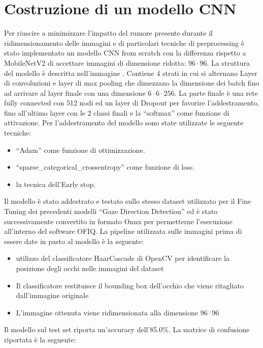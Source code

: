 \documentclass[12pt,a4paper,openright,twoside]{book}
\begin{document}
\section{Costruzione di un modello CNN}
\label{chap:build_cnn_model}
Per riuscire a minimizzare l'impatto del rumore presente durante il ridimensionamento delle immagini e di particolari tecniche di preprocessing è stato implementato un modello CNN from scratch con la differenza rispetto a MobileNetV2 di accettare immagini di dimensione ridotta: \(96 \cdot 96\).
La struttura del modello è descritta nell'immagine .
Contiene 4 strati in cui si alternano Layer di convoluzioni e layer di max pooling che dimezzano la dimensione dei batch fino ad arrivare al layer finale con una dimensione \(6 \cdot 6 \cdot 256\). La parte finale è una rete fully connected con 512 nodi ed un layer di Dropout per favorire l'addestramento, fino all'ultimo layer con le 2 classi finali e la ``softmax'' come funzione di attivazione.
Per l'addestramento del modello sono state utilizzate le seguente tecniche: \begin{itemize}
    \item ``Adam'' come funzione di ottimizzazione.
    \item ``sparse\_categorical\_crossentropy'' come funzione di loss.
    \item la tecnica dell'Early stop.
\end{itemize} 
Il modello è stato addestrato e testato sullo stesso dataset utilizzato per il Fine Tuning dei precedenti modelli ``Gaze Direction Detection'' ed è stato successivamente convertito in formato Onnx per permetterne l'esecuzione all'interno del software OFIQ.
La pipeline utilizzata sulle immagini prima di essere date in pasto al modello è la seguente: \begin{itemize}
    \item utilizzo del classificatore HaarCascade di OpenCV per identificare la posizione degli occhi nelle immagini del dataset
    \item Il classificatore restituisce il bounding box dell'occhio che viene ritagliato dall'immagine originale
    \item L'immagine ottenuta viene ridimensionata alla dimensione \(96 \cdot 96\)
\end{itemize}
Il modello sul test set riporta un'accuracy dell'85.0\%.
La matrice di confusione riportata è la seguente: 
\end{document}
